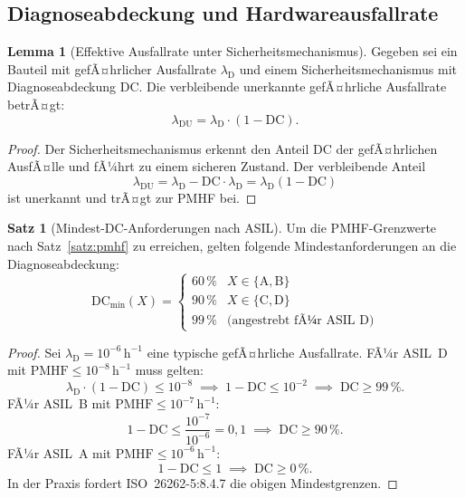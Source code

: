 ﻿\documentclass[a4paper,12pt]{article}
\theoremstyle{definition}
\newtheorem{satz}{Satz}
\newtheorem{lemma}{Lemma}
\begin{document}
\subsection{Diagnoseabdeckung und Hardwareausfallrate}

\begin{lemma}[Effektive Ausfallrate unter Sicherheitsmechanismus]
\label{lem:effektiv}
  Gegeben sei ein Bauteil mit gefÃ¤hrlicher Ausfallrate
  $\lambda_{\mathrm{D}}$ und einem Sicherheitsmechanismus mit
  Diagnoseabdeckung $\mathrm{DC}$.
  Die verbleibende unerkannte gefÃ¤hrliche Ausfallrate betrÃ¤gt:
  \[
    \lambda_{\mathrm{DU}}
    = \lambda_{\mathrm{D}} \cdot (1 - \mathrm{DC}).
  \]
\end{lemma}

\begin{proof}
  Der Sicherheitsmechanismus erkennt den Anteil $\mathrm{DC}$
  der gefÃ¤hrlichen AusfÃ¤lle und fÃ¼hrt zu einem sicheren Zustand.
  Der verbleibende Anteil
  \[
    \lambda_{\mathrm{DU}}
    = \lambda_{\mathrm{D}} - \mathrm{DC} \cdot \lambda_{\mathrm{D}}
    = \lambda_{\mathrm{D}}(1 - \mathrm{DC})
  \]
  ist unerkannt und trÃ¤gt zur PMHF bei.
\end{proof}

\begin{satz}[Mindest-DC-Anforderungen nach ASIL]
\label{satz:dc}
  Um die PMHF-Grenzwerte nach Satz~\ref{satz:pmhf} zu erreichen,
  gelten folgende Mindestanforderungen an die Diagnoseabdeckung:
  \[
    \mathrm{DC}_{\min}(X) = \begin{cases}
      60\,\% & X \in \{\mathrm{A}, \mathrm{B}\}\\
      90\,\% & X \in \{\mathrm{C}, \mathrm{D}\}\\
      99\,\% & \text{(angestrebt fÃ¼r ASIL~D)}
    \end{cases}
  \]
\end{satz}

\begin{proof}
  Sei $\lambda_{\mathrm{D}} = 10^{-6}\,\mathrm{h}^{-1}$ eine typische
  gefÃ¤hrliche Ausfallrate. FÃ¼r ASIL~D mit
  $\mathrm{PMHF} \leq 10^{-8}\,\mathrm{h}^{-1}$ muss gelten:
  \[
    \lambda_{\mathrm{D}} \cdot (1 - \mathrm{DC}) \leq 10^{-8}
    \;\implies\;
    1 - \mathrm{DC} \leq 10^{-2}
    \;\implies\;
    \mathrm{DC} \geq 99\,\%.
  \]
  FÃ¼r ASIL~B mit $\mathrm{PMHF} \leq 10^{-7}\,\mathrm{h}^{-1}$:
  \[
    1 - \mathrm{DC} \leq \frac{10^{-7}}{10^{-6}} = 0{,}1
    \;\implies\;
    \mathrm{DC} \geq 90\,\%.
  \]
  FÃ¼r ASIL~A mit $\mathrm{PMHF} \leq 10^{-6}\,\mathrm{h}^{-1}$:
  \[
    1 - \mathrm{DC} \leq 1
    \;\implies\;
    \mathrm{DC} \geq 0\,\%.
  \]
  In der Praxis fordert ISO~26262-5:8.4.7 die obigen Mindestgrenzen.
\end{proof}
\end{document}

